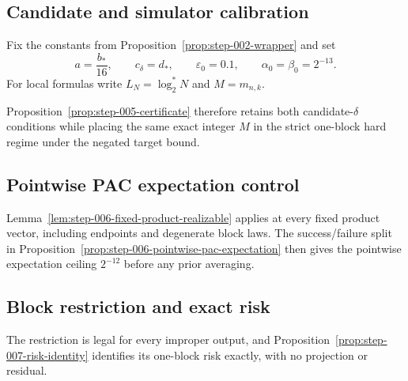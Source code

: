 \subsection{Candidate and simulator calibration}\label{app:step-005}
Fix the constants from Proposition~\ref{prop:step-002-wrapper} and set
\begin{equation}
a=\frac{b_*}{16},
\qquad c_\delta=d_*,
\qquad \varepsilon_0=0.1,
\qquad \alpha_0=\beta_0=2^{-13}.
\tag{C1}\label{eq:calibration}
\end{equation}
For local formulas write $L_N=\log_2^*N$ and $M=m_{n,k}$.

Proposition~\ref{prop:step-005-certificate} therefore retains both
candidate-$\delta$ conditions while placing the same exact integer $M$ in
the strict one-block hard regime under the negated target bound.

\subsection{Pointwise PAC expectation control}\label{app:step-006}

Lemma~\ref{lem:step-006-fixed-product-realizable} applies at every fixed
product vector, including endpoints and degenerate block laws.  The
success/failure split in
Proposition~\ref{prop:step-006-pointwise-pac-expectation} then gives the
pointwise expectation ceiling $2^{-12}$ before any prior averaging.

\subsection{Block restriction and exact risk}\label{app:step-007}

The restriction is legal for every improper output, and
Proposition~\ref{prop:step-007-risk-identity} identifies its one-block risk
exactly, with no projection or residual.

